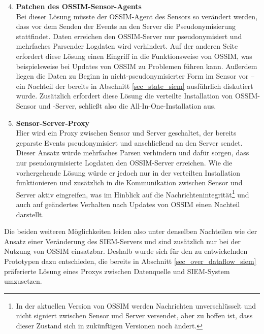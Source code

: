 \begin{enumerate}
\setcounter{enumi}{3}

\item \textbf{Patchen des OSSIM-Sensor-Agents}\\
  Bei dieser Lösung müsste der OSSIM-Agent des Sensors so verändert werden, dass vor dem Senden der Events an den Server die Pseudonymisierung stattfindet. Daten erreichen den OSSIM-Server nur pseudonymisiert und mehrfaches Parsender Logdaten wird verhindert. Auf der anderen Seite erfordert diese Lösung einen Eingriff in die Funktionsweise von OSSIM, was beispielsweise bei Updates von OSSIM zu Problemen führen kann. Außerdem liegen die Daten zu Beginn in nicht-pseudonymisierter Form im Sensor vor -- ein Nachteil der bereits in Abschnitt \ref{sec_state_siem} ausführlich diskutiert wurde. Zusätzlich erfordert diese Lösung die verteilte Installation von OSSIM-Sensor und -Server, schließt also die All-In-One-Installation aus.
  
\item \textbf{Sensor-Server-Proxy}\\
  Hier wird ein Proxy zwischen Sensor und Server geschaltet, der bereits geparste Events pseudonymisiert und anschließend an den Server sendet. Dieser Ansatz würde mehrfaches Parsen verhindern und dafür sorgen, dass nur pseudonymisierte Logdaten den OSSIM-Server erreichen. Wie die vorhergehende Lösung würde er jedoch nur in der verteilten Installation funktionieren und zusätzlich in die Kommunikation zwischen Sensor und Server aktiv eingreifen, was im Hinblick auf die Nachrichtenintegrität\footnote{
    In der aktuellen Version von OSSIM werden Nachrichten unverschlüsselt und nicht signiert zwischen Sensor und Server versendet, aber zu hoffen ist, dass dieser Zustand sich in zukünftigen Versionen noch ändert.
  } und auch auf geändertes Verhalten nach Updates von OSSIM einen Nachteil darstellt.
\end{enumerate}

%

Die beiden weiteren Möglichkeiten leiden also unter denselben Nachteilen wie der Ansatz einer Veränderung des SIEM-Servers und sind zusätzlich nur bei der Nutzung von OSSIM einsatzbar.
Deshalb wurde sich für den zu entwickelnden Prototypen dazu entschieden, die bereits in Abschnitt \ref{sec_over_dataflow_siem} präferierte Lösung eines Proxys zwischen Datenquelle und SIEM-System umzusetzen.


